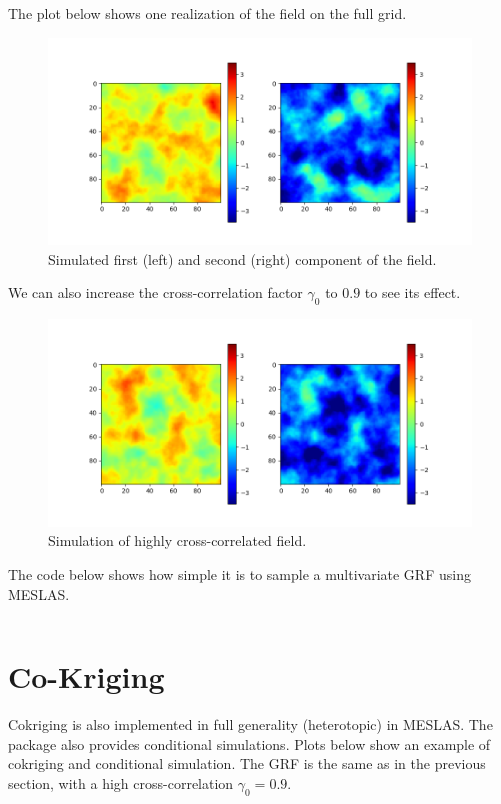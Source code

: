 \documentclass[a4paper,10pt]{article}
\begin{document}
The plot below shows one realization of the field on the full grid.
\begin{figure}[tbh!p]
\centering
\includegraphics[scale=0.65]{images/sample_low_correlation.png}
\caption{Simulated first (left) and second (right) component of the field.}
\end{figure}

We can also increase the cross-correlation factor $\gamma_0$ to $0.9$ to see
its effect.
\begin{figure}[tbh!p]
\centering
\includegraphics[scale=0.65]{images/sample_high_correlation.png}
\caption{Simulation of highly cross-correlated field.}
\end{figure}

\newpage
The code below shows how simple it is to sample a multivariate GRF using MESLAS.
\inputminted{python}{example_sample.py}

\section{Co-Kriging}
Cokriging is also implemented in full generality (heterotopic) in MESLAS. The package also provides conditional simulations. Plots below show an example of cokriging and conditional simulation. The GRF is the same as in the previous section, with a high cross-correlation $\gamma_0=0.9$.
\end{document}
